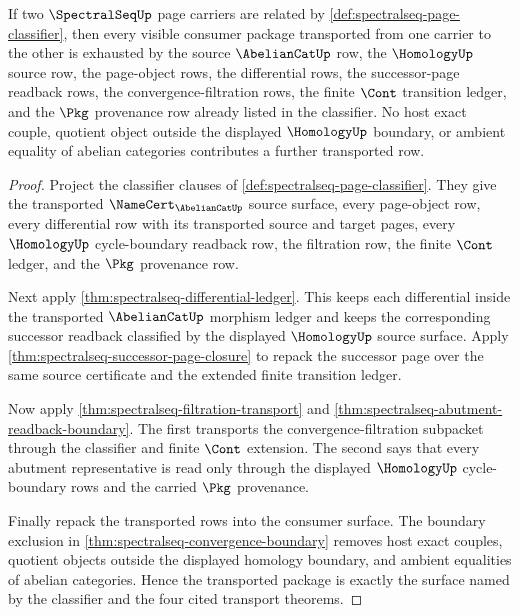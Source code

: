 \begin{theorem}
\label{thm:spectralseq-page-classifier-transport-exactness}
If two $\SpectralSeqUp$ page carriers are related by
\autoref{def:spectralseq-page-classifier}, then every visible consumer package
transported from one carrier to the other is exhausted by the source
$\AbelianCatUp$ row, the $\HomologyUp$ source row, the page-object rows, the
differential rows, the successor-page readback rows, the
convergence-filtration rows, the finite $\Cont$ transition ledger, and the
$\Pkg$ provenance row already listed in the classifier. No host exact couple,
quotient object outside the displayed $\HomologyUp$ boundary, or ambient
equality of abelian categories contributes a further transported row.
\end{theorem}
\begin{proof}
Project the classifier clauses of
\autoref{def:spectralseq-page-classifier}. They give the transported
$\NameCert_{\AbelianCatUp}$ source surface, every page-object row, every
differential row with its transported source and target pages, every
$\HomologyUp$ cycle-boundary readback row, the filtration row, the finite
$\Cont$ ledger, and the $\Pkg$ provenance row.

Next apply \autoref{thm:spectralseq-differential-ledger}. This keeps each
differential inside the transported $\AbelianCatUp$ morphism ledger and keeps
the corresponding successor readback classified by the displayed
$\HomologyUp$ source surface. Apply
\autoref{thm:spectralseq-successor-page-closure} to repack the successor page
over the same source certificate and the extended finite transition ledger.

Now apply \autoref{thm:spectralseq-filtration-transport} and
\autoref{thm:spectralseq-abutment-readback-boundary}. The first transports the
convergence-filtration subpacket through the classifier and finite $\Cont$
extension. The second says that every abutment representative is read only
through the displayed $\HomologyUp$ cycle-boundary rows and the carried
$\Pkg$ provenance.

Finally repack the transported rows into the consumer surface. The boundary
exclusion in \autoref{thm:spectralseq-convergence-boundary} removes host exact
couples, quotient objects outside the displayed homology boundary, and ambient
equalities of abelian categories. Hence the transported package is exactly the
surface named by the classifier and the four cited transport theorems.
\end{proof}


